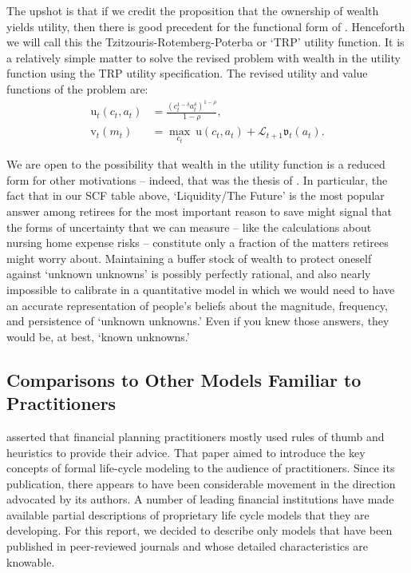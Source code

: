 \documentclass{article}
\newcommand{\CRRA}{\rho}
\newcommand{\uFunc}{\mathrm{u}}
\newcommand{\vFunc}{\mathrm{v}}
\newcommand{\Alive}{\mathcal{L}}
\newcommand{\cNrm}{c}
\newcommand{\aNrm}{a}
\newcommand{\mNrm}{m}
\begin{document}
The upshot is that if we credit the proposition that the ownership of wealth yields utility, then there is good precedent for the functional form of \cite{Tzitzouris2024}.
Henceforth we will call this the Tzitzouris-Rotemberg-Poterba or `TRP' utility function.
It is a relatively simple matter to solve the revised problem with wealth in the utility function using the TRP utility specification. The revised utility and value functions of the problem are:
\begin{align}
    \uFunc_t(\cNrm_t, \aNrm_t) & = \frac{\left(\cNrm_t^{1-\delta}\aNrm_t^{\delta}\right)^{1-\CRRA}}{1-\CRRA}, \\
    {\vFunc}_{t}({\mNrm}_{t}) & = \max_{\cNrm_{t}} ~ \uFunc(\cNrm_{t}, \aNrm_{t})+\Alive_{t+1}\mathfrak{v}_{t}(a_{t}).
\end{align}


We are open to the possibility that wealth in the utility function is a reduced form for other motivations -- indeed, that was the thesis of \cite{WhyDoTheRich}.
In particular, the fact that in our SCF table above, `Liquidity/The Future' is the most popular answer among retirees for the most important reason to save might signal that the forms of uncertainty that we can measure -- like the \cite{Ameriks2020jpe} calculations about nursing home expense risks -- constitute only a fraction of the matters retirees might worry about.
Maintaining a buffer stock of wealth to protect oneself against `unknown unknowns' is possibly perfectly rational, and also nearly impossible to calibrate in a quantitative model in which we would need to have an accurate representation of people's beliefs about the magnitude, frequency, and persistence of `unknown unknowns.'
Even if you knew those answers, they would be, at best, `known unknowns.'

\subsection{Comparisons to Other Models Familiar to Practitioners}

\cite{Gordon_2014} asserted that financial planning practitioners mostly used rules of thumb and heuristics to provide their advice.
That paper aimed to introduce the key concepts of formal life-cycle modeling to the audience of practitioners.
Since its publication, there appears to have been considerable movement in the direction advocated by its authors.
A number of leading financial institutions have made available partial descriptions of proprietary life cycle models that they are developing.
For this report, we decided to describe only models that have been published in peer-reviewed journals and whose detailed characteristics are knowable.
\end{document}
